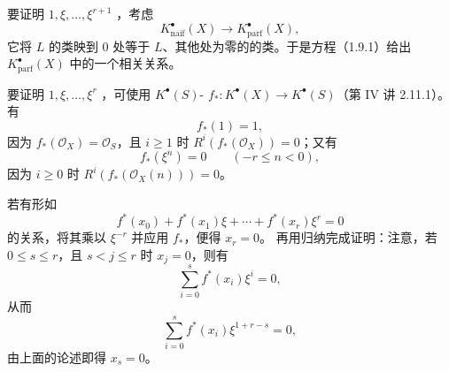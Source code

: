 要证明 $1,\xi,\ldots,\xi^{r+1}$ ，考虑
\[
K^\bullet_{\text{naïf}}(X)\longrightarrow K^\bullet_{\mathrm{parf}}(X),
\]
它将 $L$ 的类映到 $0$ 处等于 $L$、其他处为零的的类。于是方程（1.9.1）给出 $K^\bullet_{\mathrm{parf}}(X)$ 中的一个相关关系。

要证明 $1,\xi,\ldots,\xi^r$ ，可使用 $K^\bullet(S)$- $f_*:K^\bullet(X)\to K^\bullet(S)$（第 IV 讲 2.11.1）。有
\[
f_*(1)=1,
\]
因为 $f_*(\mathcal O_X)=\mathcal O_S$，且 $i\geq1$ 时 $R^i(f_*(\mathcal O_X))=0$；又有
\[
f_*(\xi^n)=0\qquad(-r\leq n<0),
\]
因为 $i\geq0$ 时 $R^i(f_*(\mathcal O_X(n)))=0$。

若有形如
\[
f^*(x_0)+f^*(x_1)\xi+\cdots+f^*(x_r)\xi^r=0
\]
的关系，将其乘以 $\xi^{-r}$ 并应用 $f_*$，便得 $x_r=0$。
再用归纳完成证明：注意，若 $0\leq s\leq r$，且 $s<j\leq r$ 时 $x_j=0$，则有
\[
\sum_{i=0}^s f^*(x_i)\xi^i=0,
\]
从而
\[
\sum_{i=0}^s f^*(x_i)\xi^{1+r-s}=0,
\]
由上面的论述即得 $x_s=0$。
